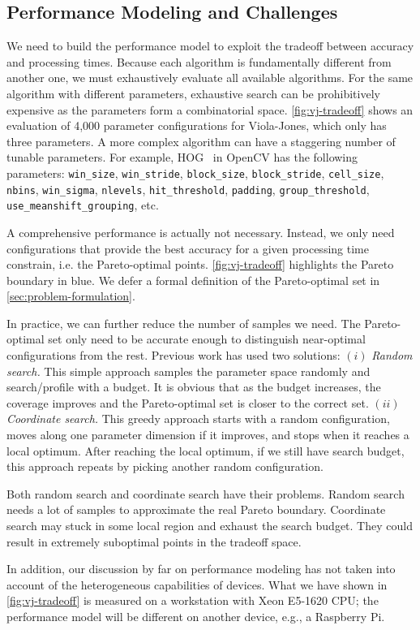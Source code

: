 
\subsection{Performance Modeling and Challenges}
\label{sec:perf-model-chall}

We need to build the performance model to exploit the tradeoff between accuracy
and processing times. Because each algorithm is fundamentally different from
another one, we must exhaustively evaluate all available algorithms. For the
same algorithm with different parameters, exhaustive search can be prohibitively
expensive as the parameters form a combinatorial
space. \autoref{fig:vj-tradeoff} shows an evaluation of 4,000 parameter
configurations for Viola-Jones, which only has three parameters. A more complex
algorithm can have a staggering number of tunable parameters. For example,
HOG~\cite{dalal2005histograms} in OpenCV has the following parameters:
\texttt{win\_size}, \texttt{win\_stride}, \texttt{block\_size},
\texttt{block\_stride}, \texttt{cell\_size}, \texttt{nbins},
\texttt{win\_sigma}, \texttt{nlevels}, \texttt{hit\_threshold},
\texttt{padding}, \texttt{group\_threshold}, \texttt{use\_meanshift\_grouping},
etc.

A comprehensive performance is actually not necessary. Instead, we only need
configurations that provide the best accuracy for a given processing time
constrain, i.e. the Pareto-optimal points. \autoref{fig:vj-tradeoff} highlights
the Pareto boundary in blue. We defer a formal definition of the Pareto-optimal
set in \autoref{sec:problem-formulation}.

In practice, we can further reduce the number of samples we need. The
Pareto-optimal set only need to be accurate enough to distinguish near-optimal
configurations from the rest. Previous work has used two solutions: $(i)$
\textit{Random search.}  This simple approach samples the parameter space
randomly and search/profile with a budget. It is obvious that as the budget
increases, the coverage improves and the Pareto-optimal set is closer to the
correct set. $(ii)$ \textit{Coordinate search.} This greedy approach starts with
a random configuration, moves along one parameter dimension if it improves, and
stops when it reaches a local optimum. After reaching the local optimum, if we
still have search budget, this approach repeats by picking another random
configuration.

Both random search and coordinate search have their problems. Random search
needs a lot of samples to approximate the real Pareto boundary. Coordinate
search may stuck in some local region and exhaust the search budget. They could
result in extremely suboptimal points in the tradeoff space.

In addition, our discussion by far on performance modeling has not taken into
account of the heterogeneous capabilities of devices. What we have shown in
\autoref{fig:vj-tradeoff} is measured on a workstation with Xeon E5-1620 CPU;
the performance model will be different on another device, e.g., a Raspberry Pi.

